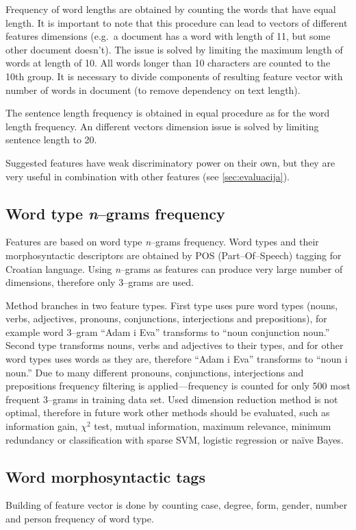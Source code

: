 \documentclass[11pt,english]{article}
\begin{document}
\begin{multicols}{2}
Frequency of word lengths are obtained by counting the words that have equal
length. It is important to note that this procedure can lead to vectors of
different features dimensions (e.g.\ a document has a word with length of 11,
but some other document doesn't). The issue is solved by limiting the maximum
length of words at length of 10. All words longer than 10 characters are
counted to the 10th group. It is necessary to divide components of resulting feature
vector with number of words in document (to remove dependency on text length).

The sentence length frequency is obtained in equal procedure as for the word
length frequency. An different vectors dimension issue is solved by limiting
sentence length to 20.

Suggested features have weak discriminatory power on their own, but they are
very useful in combination with other features (see \ref{sec:evaluacija}).

\subsection{Word type \emph{n}--grams frequency}
\label{sec:ngrami-tipova}
Features are based on word type \emph{n}--grams frequency. Word types and their
morphosyntactic descriptors are obtained by POS (Part--Of--Speech) tagging for
Croatian language. Using \emph{n}--grams as features can produce very large
number of dimensions, therefore only 3--grams are used.

Method branches in two feature types. First type uses pure word types (nouns,
verbs, adjectives, pronouns, conjunctions, interjections and prepositions), for
example word 3--gram ``Adam i Eva'' transforms to ``noun conjunction noun.''
Second type transforms nouns, verbs and adjectives to their types, and for other
word types uses words as they are, therefore ``Adam i Eva'' transforms to
``noun i noun.'' Due to many different pronouns, conjunctions, interjections and
prepositions frequency filtering is applied---frequency is counted for only 500
most frequent 3--grams in training data set. Used dimension reduction method is
not optimal, therefore in future work other methods should be evaluated, such as
information gain, $\chi^2$ test, mutual information, maximum relevance, minimum
redundancy or classification with sparse SVM, logistic regression or na\"ive
Bayes.

\subsection{Word morphosyntactic tags}
\label{sec:morphosyntactic}
Building of feature vector is done by counting case, degree, form,
gender, number and person frequency of word type.


\end{multicols}
\end{document}
